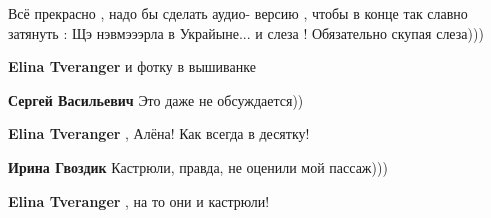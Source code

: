 \begin{itemize}
Всё прекрасно , надо бы сделать аудио- версию , чтобы в конце так славно
затянуть : Щэ нэвмэээрла в Украйыне... и слеза ! Обязательно скупая слеза)))

\begin{itemize}
 
\textbf{Elina Tveranger} и фотку в вышиванке

 
\textbf{Сергей Васильевич} Это даже не обсуждается))

 
\textbf{Elina Tveranger} , Алёна! Как всегда в десятку!🤣🤣🤣🤣

 
\textbf{Ирина Гвоздик} Кастрюли, правда, не оценили мой пассаж)))

 
\textbf{Elina Tveranger} , на то они и кастрюли! 🤣🤣🤣🤣

\end{itemize}

 

\end{itemize}
